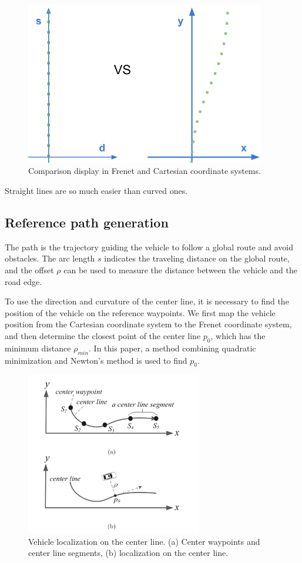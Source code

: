 \begin{figure}[h]
\centering
\includegraphics[height=2.8in]{figs/ch3/frenet-final}
\caption{Comparison display in Frenet and Cartesian coordinate systems.}
\label{fig:frenet-final}
\end{figure}

Straight lines are so much easier than curved ones.

\subsection{Reference path generation}

The path is the trajectory guiding the vehicle to follow a global route and avoid obstacles. The arc length $s$ indicates the traveling distance on the global route, and the offset $\rho$ can be used to measure the distance between the vehicle and the road edge.

To use the direction and curvature of the center line, it is necessary to find the position of the vehicle on the reference waypoints. We first map the vehicle position from the Cartesian coordinate system to the Frenet coordinate system, and then determine the closest point of the center line $p_0$, which has the minimum distance $\rho_{min}$. In this paper, a method combining quadratic minimization and Newton's method is used to find $p_0$.

\begin{figure}[h]
\centering
\includegraphics[height=2.8in]{figs/ch3/location-on-center-line}
\caption{Vehicle localization on the center line. (a) Center waypoints and center line segments, (b) localization on the center line.}
\label{fig:loc-line}
\end{figure}

